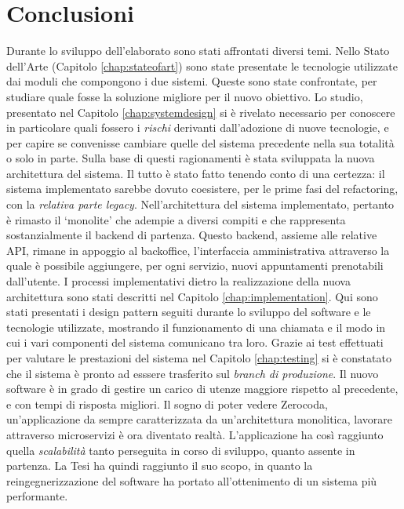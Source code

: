 \chapter*{Conclusioni}
\label{chap:conclusion}
Durante lo sviluppo dell'elaborato sono stati affrontati diversi temi. Nello Stato dell'Arte (Capitolo \ref{chap:stateofart}) sono state presentate le tecnologie utilizzate dai moduli che compongono i due sistemi. Queste sono state confrontate, per studiare quale fosse la soluzione migliore per il nuovo obiettivo. Lo studio, presentato nel Capitolo \ref{chap:systemdesign} si è rivelato necessario per conoscere in particolare quali fossero i \emph{rischi} derivanti dall'adozione di nuove tecnologie, e per capire se convenisse cambiare quelle del sistema precedente nella sua totalità o solo in parte. Sulla base di questi ragionamenti è stata sviluppata la nuova architettura del sistema. Il tutto è stato fatto tenendo conto di una certezza: il sistema implementato sarebbe dovuto coesistere, per le prime fasi del refactoring, con la \emph{relativa parte legacy}. Nell'architettura del sistema implementato, pertanto è rimasto il `monolite' che adempie a diversi compiti e che rappresenta sostanzialmente il backend di partenza. Questo backend, assieme alle relative API, rimane in appoggio al backoffice, l'interfaccia amministrativa attraverso la quale è possibile aggiungere, per ogni servizio, nuovi appuntamenti prenotabili dall'utente. I processi implementativi dietro la realizzazione della nuova architettura sono stati descritti nel Capitolo \ref{chap:implementation}. Qui sono stati presentati i design pattern seguiti durante lo sviluppo del software e le tecnologie utilizzate, mostrando il funzionamento di una chiamata e il modo in cui i vari componenti del sistema comunicano tra loro. Grazie ai test effettuati per valutare le prestazioni del sistema nel Capitolo \ref{chap:testing} si è constatato che il sistema è pronto ad esssere trasferito sul \emph{branch di produzione}. Il nuovo software è in grado di gestire un carico di utenze maggiore rispetto al precedente, e con tempi di risposta migliori. Il sogno di poter vedere Zerocoda, un'applicazione da sempre caratterizzata da un'architettura monolitica, lavorare attraverso microservizi è ora diventato realtà. L'applicazione ha così raggiunto quella \emph{scalabilità} tanto perseguita in corso di sviluppo, quanto assente in partenza. La Tesi ha quindi raggiunto il suo scopo, in quanto la reingegnerizzazione del software ha portato all'ottenimento di un sistema più performante.

